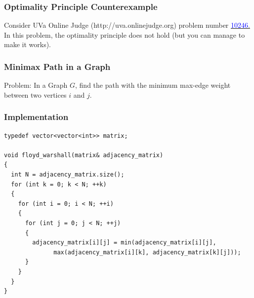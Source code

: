 \documentclass{beamer}
\newcommand{\uvalink}[2]{UVa Online Judge (http://uva.onlinejudge.org)
  problem number \href{#2}{\textcolor{blue}{#1}.}}
\begin{document}
\begin{frame}%
\frametitle{Optimality Principle Counterexample}
\label{slide:optimality_principle_counterexample2}
Consider \uvalink{10246}{https://uva.onlinejudge.org/index.php?option=com_onlinejudge&Itemid=8&page=show_problem&problem=1187}\\
In this problem, the optimality principle does not hold (but you can manage to make it works).



\end{frame}

\begin{frame}%
\frametitle{Minimax Path in a Graph}

\begin{mdframed}[style=exampledefault]
Problem: In a Graph $G$, find the path with the minimum max-edge weight between two vertices $i$ and $j$.
\end{mdframed}


\end{frame}

\begin{frame}[containsverbatim]
\frametitle{Implementation}

\scriptsize
\begin{lstlisting}
typedef vector<vector<int>> matrix;

void floyd_warshall(matrix& adjacency_matrix)
{
  int N = adjacency_matrix.size();
  for (int k = 0; k < N; ++k)
  {
    for (int i = 0; i < N; ++i)
    {
      for (int j = 0; j < N; ++j)
      {
        adjacency_matrix[i][j] = min(adjacency_matrix[i][j],
              max(adjacency_matrix[i][k], adjacency_matrix[k][j]));
      }
    }
  }
}
\end{lstlisting}

\end{frame}
\end{document}

